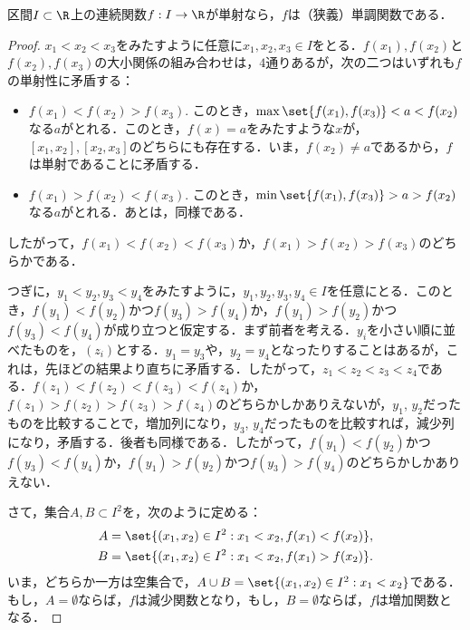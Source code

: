 \documentclass[a4paper,10pt]{ltjsarticle}
\begin{document}
\begin{MyLemma}
  区間\(I \subset \R\)上の連続関数\(f: I \to \R\)が単射なら，\(f\)は（狭義）単調関数である．
\end{MyLemma}
\begin{proof}
  \(x_1 < x_2 < x_3\)をみたすように任意に\(x_1, x_2, x_3 \in I\)をとる．\(f(x_1), f(x_2)\)と\(f(x_2), f(x_3)\)の大小関係の組み合わせは，\(4\)通りあるが，次の二つはいずれも\(f\)の単射性に矛盾する：
  \begin{itemize}
    \item \(f(x_1) < f(x_2) > f(x_3)\). このとき，\(\max\set{f(x_1), f(x_3)} < a < f(x_2)\)なる\(a\)がとれる．このとき，\(f(x) = a\)をみたすような\(x\)が，\([x_1, x_2], [x_2, x_3]\)のどちらにも存在する．いま，\(f(x_2) \ne a\)であるから，\(f\)は単射であることに矛盾する．
    \item \(f(x_1) > f(x_2) < f(x_3)\). このとき，\(\min\set{f(x_1), f(x_3)} > a > f(x_2)\)なる\(a\)がとれる．あとは，同様である．
  \end{itemize}
  したがって，\(f(x_1) < f(x_2) < f(x_3)\)か，\(f(x_1) > f(x_2) > f(x_3)\)のどちらかである．

  つぎに，\(y_1 < y_2,  y_3 < y_4\)をみたすように，\(y_1, y_2, y_3, y_4 \in I\)を任意にとる．このとき，\(f(y_1) < f(y_2)\)かつ\(f(y_3) > f(y_4)\)か，\(f(y_1) > f(y_2)\)かつ\(f(y_3) < f(y_4)\)が成り立つと仮定する．まず前者を考える．\(y_i\)を小さい順に並べたものを，\((z_i)\)とする．\(y_1 = y_3\)や，\(y_2 = y_4\)となったりすることはあるが，これは，先ほどの結果より直ちに矛盾する．したがって，\(z_1 < z_2 < z_3 < z_4\)である．\(f(z_1) < f(z_2) < f(z_3) < f(z_4)\)か，\(f(z_1) > f(z_2) > f(z_3) > f(z_4)\)のどちらかしかありえないが，\(y_1\), \(y_2\)だったものを比較することで，増加列になり，\(y_3\), \(y_4\)だったものを比較すれば，減少列になり，矛盾する．後者も同様である．したがって，\(f(y_1) < f(y_2)\)かつ\(f(y_3) < f(y_4)\)か，\(f(y_1) > f(y_2)\)かつ\(f(y_3) > f(y_4)\)のどちらかしかありえない．

  さて，集合\(A, B \subset I^2\)を，次のように定める：
  \begin{align*}
    A & = \set{(x_1, x_2) \in I^2 : x_1 < x_2, f(x_1) < f(x_2)}, \\
    B & = \set{(x_1, x_2) \in I^2 : x_1 < x_2, f(x_1) > f(x_2)}.
  \end{align*}
  いま，どちらか一方は空集合で，\(A \cup B = \set{(x_1, x_2) \in I^2 : x_1 < x_2}\)である．もし，\(A = \emptyset\)ならば，\(f\)は減少関数となり，もし，\(B = \emptyset\)ならば，\(f\)は増加関数となる．
\end{proof}
\end{document}
